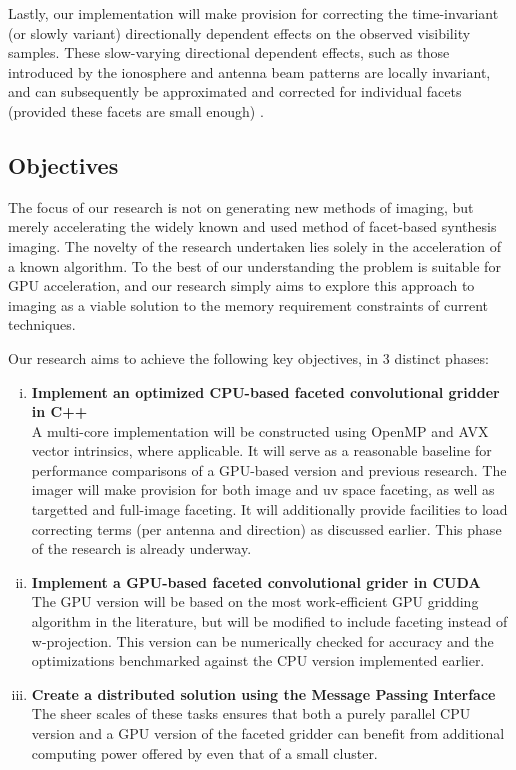 \documentclass[a4paper, two column]{article}
\begin{document}
Lastly, our implementation will make provision for correcting the time-invariant (or slowly variant) directionally dependent effects on the observed visibility samples. 
These slow-varying directional dependent effects, such as those introduced by the ionosphere and antenna beam patterns are locally invariant, and can subsequently be approximated and corrected for 
individual facets (provided these facets are small enough) \cite{2011A&A...527A.106S,2011A&A...527A.107S}.

\subsection{Objectives}
The focus of our research is not on generating new methods of imaging, but merely accelerating the widely known and used method of facet-based synthesis imaging. The novelty of the research undertaken 
lies solely in the acceleration of a known algorithm. To the best of our understanding the problem is suitable for GPU acceleration, and our research simply aims to explore this approach to imaging 
as a viable solution to the memory requirement constraints of current techniques.

Our research aims to achieve the following key objectives, in 3 distinct phases:
\begin{enumerate}[i)]
 \item \textbf{Implement an optimized CPU-based faceted convolutional gridder in C++}\\
  A multi-core implementation will be constructed using OpenMP and AVX vector intrinsics, where applicable. It will serve as a reasonable baseline for performance 
  comparisons of a GPU-based version and previous research. The imager will make provision for both image and uv space faceting, as well as targetted and full-image faceting. It will 
  additionally provide facilities to load correcting terms (per antenna and direction) as discussed earlier. This phase of the research is already underway.
 \item \textbf{Implement a GPU-based faceted convolutional grider in CUDA}\\
  The GPU version will be based on the most work-efficient GPU gridding algorithm in the literature, but will be modified to include faceting instead of w-projection. This version
  can be numerically checked for accuracy and the optimizations benchmarked against the CPU version implemented earlier.
 \item \textbf{Create a distributed solution using the Message Passing Interface}\\
  The sheer scales of these tasks ensures that both a purely parallel CPU version and a GPU version of the faceted gridder can benefit from additional computing power offered by even that of a small cluster.
\end{enumerate}
\end{document}
